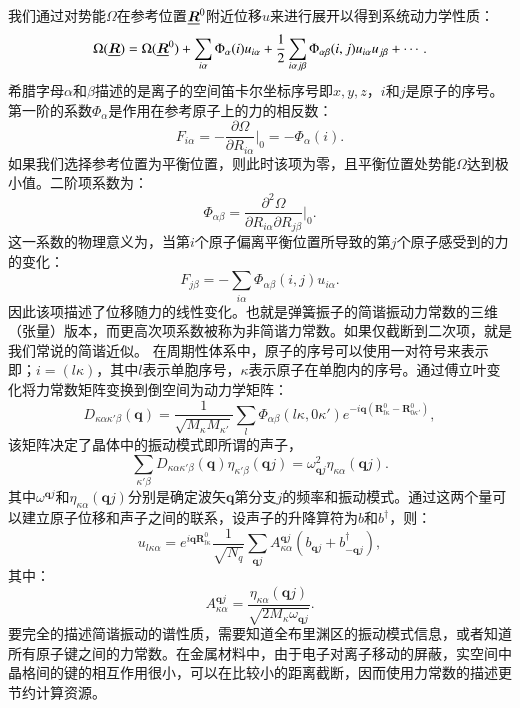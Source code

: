 我们通过对势能$\Omega$在参考位置$\underline{\bm{R}}^0$附近位移$u$来进行展开以得到系统动力学性质：
\begin{equation}
  \Omega(\underline{\bm{R}}) = \Omega(\underline{\bm{R}}^0) + \sum_{i\alpha} \Phi_\alpha(i)u_{i\alpha} + \frac{1}{2} \sum_{i\alpha j\beta} \Phi_{\alpha\beta}(i,j) u_{i\alpha}u_{j\beta} + \cdots .
\end{equation}
希腊字母$\alpha$和$\beta$描述的是离子的空间笛卡尔坐标序号即$x,y,z$，$i$和$j$是原子的序号。第一阶的系数$\Phi_\alpha$是作用在参考原子上的力的相反数：
\begin{equation}
  F_{i\alpha} = -\frac{\partial\Omega}{\partial R_{i\alpha}}\bigg|_0 = -\Phi_\alpha(i).
\end{equation}
如果我们选择参考位置为平衡位置，则此时该项为零，且平衡位置处势能$\Omega$达到极小值。二阶项系数为：
\begin{equation}\label{eq:omega_second_order}
  \Phi_{\alpha\beta} = \frac{\partial^2\Omega}{\partial R_{i\alpha}\partial R_{j\beta}} \bigg|_0 .
\end{equation}
这一系数的物理意义为，当第$i$个原子偏离平衡位置所导致的第$j$个原子感受到的力的变化：
\begin{equation}
  F_{j\beta} = -\sum_{i\alpha} \Phi_{\alpha\beta}(i,j)u_{i\alpha}.
\end{equation}
因此该项描述了位移随力的线性变化。也就是弹簧振子的简谐振动力常数的三维（张量）版本，而更高次项系数被称为非简谐力常数。如果仅截断到二次项，就是我们常说的简谐近似。
在周期性体系中，原子的序号可以使用一对符号来表示即；$i=(l\kappa)$，其中$l$表示单胞序号，$\kappa$表示原子在单胞内的序号。通过傅立叶变化将力常数矩阵变换到倒空间为动力学矩阵：
\begin{equation}
  D_{\kappa\alpha\kappa'\beta}(\bm{q}) = \frac{1}{\sqrt{M_\kappa M_{\kappa'}}} \sum_l \Phi_{\alpha\beta}(l\kappa,0\kappa')e^{-i\bm{q}(\bm{R}^0_{l\kappa}-\bm{R}^0_{0\kappa'})},
\end{equation}
该矩阵决定了晶体中的振动模式即所谓的声子，
\begin{equation}
  \sum_{\kappa'\beta}D_{\kappa\alpha\kappa'\beta}(\bm{q})\eta_{\kappa'\beta}(\bm{q}j) = \omega^2_{\bm{q}j}\eta_{\kappa\alpha}(\bm{q}j).
\end{equation}
其中$\omega^{\bm{q}j}$和$\eta_{\kappa\alpha}(\bm{q}j)$分别是确定波矢$\bm{q}$第分支$j$的频率和振动模式。通过这两个量可以建立原子位移和声子之间的联系，设声子的升降算符为$b$和$b^{\dagger}$，则：
\begin{equation}
  u_{l\kappa\alpha} = e^{i\bm{q}\bm{R}^0_{l\kappa}}\frac{1}{\sqrt{N_q}} \sum_{\bm{q}j} A^{\bm{q}j}_{\kappa\alpha}(b_{\bm{q}j} + b^{\dagger}_{-\bm{q}j}),
\end{equation}
其中：
\begin{equation}
  A^{\bm{q}j}_{\kappa\alpha} = \frac{\eta_{\kappa\alpha}(\bm{q}j)}{\sqrt{2M_\kappa \omega_{\bm{q}j}}}.
\end{equation}
要完全的描述简谐振动的谱性质，需要知道全布里渊区的振动模式信息，或者知道所有原子键之间的力常数。在金属材料中，由于电子对离子移动的屏蔽，实空间中晶格间的键的相互作用很小，可以在比较小的距离截断，因而使用力常数的描述更节约计算资源。

